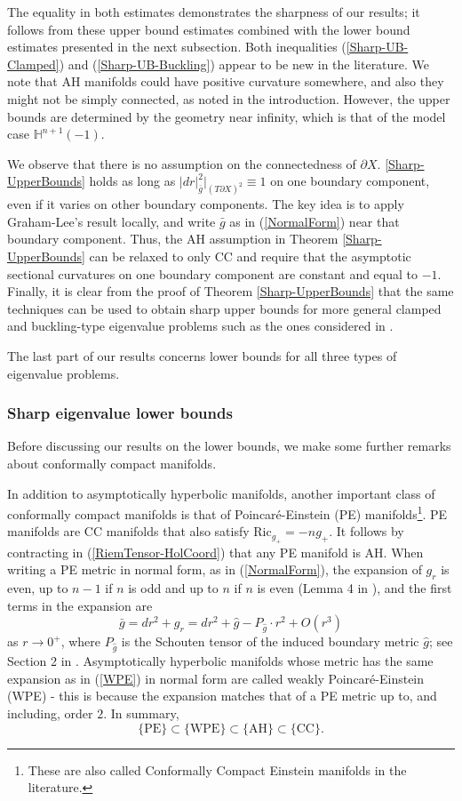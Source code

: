 \documentclass{amsart}
\newcommand{\Ric}{\text{Ric}}
\newcommand{\Hyp}{\mathbb{H}^{n+1}(-1)}
\begin{document}
The equality in both estimates demonstrates the sharpness of our results; it follows from these upper bound estimates combined with the lower bound estimates presented in the next subsection. Both inequalities (\ref{Sharp-UB-Clamped}) and (\ref{Sharp-UB-Buckling}) appear to be new in the literature. We note that AH manifolds could have positive curvature somewhere, and also they might not be simply connected, as noted in the introduction. However, the upper bounds are determined by the geometry near infinity, which is that of the model case $\Hyp$. 

We observe  that there is no assumption on the connectedness of $\partial X$. \cref{Sharp-UpperBounds} holds as long as $|dr|^2_{\bar g}|_{(T\partial X)^2}\equiv 1$ on one boundary component, even if it varies on other boundary components. The key idea is to apply Graham-Lee's result locally, and write $\bar g$ as in (\ref{NormalForm}) near that boundary component. Thus, the AH assumption in Theorem \ref{Sharp-UpperBounds} can be relaxed to only CC and require that the asymptotic sectional curvatures on one boundary component are constant and equal to $-1$. Finally, it is clear from the proof of Theorem \ref{Sharp-UpperBounds} that the same techniques can be used to obtain sharp upper bounds for more general clamped and buckling-type eigenvalue problems such as the ones considered in \cite{BuosoLamberti2013}.

The last part of our results concerns lower bounds for all three types of eigenvalue problems. 

\subsubsection{Sharp eigenvalue lower bounds}

Before discussing our results on the lower bounds, we make some further remarks about conformally compact manifolds. 

In addition to asymptotically hyperbolic manifolds, another important class of conformally compact manifolds is that of Poincar\'e-Einstein (PE) manifolds\footnote{These are also called Conformally Compact Einstein manifolds in the literature.}. PE manifolds are CC manifolds that also satisfy $\Ric_{g_+} = -ng_+$. It follows by contracting in (\ref{RiemTensor-HolCoord}) that any PE manifold is AH. When writing a PE metric in normal form, as in (\ref{NormalForm}), the expansion of $g_r$ is even, up to $n-1$ if $n$ is odd and up to $n$ if $n$ is even (Lemma 4 in \cite{ChangSun-YungA.2007SPiC}), and the first terms in the expansion are
\begin{equation}\label{WPE}
    \bar g = dr^2+g_r = dr^2+ \hat g - P_{\hat g}\cdot r^2 + O(r^3)
\end{equation}
as $r\to 0^+$, where $P_{\hat g}$ is the Schouten tensor of the induced boundary metric $\hat g$; see Section 2 in \cite{Graham}. Asymptotically hyperbolic manifolds whose metric has the same expansion as in (\ref{WPE}) in normal form are called weakly Poincar\'e-Einstein (WPE) - this is because the expansion matches that of a PE metric up to, and including, order $2$. In summary, 
\[
\{\text{PE}\}\subset \{\text{WPE}\}\subset \{\text{AH}\}\subset \{\text{CC}\}.
\]
\end{document}

